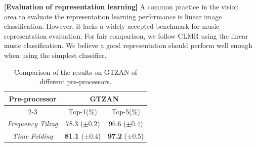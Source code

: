 \documentclass{article}
\begin{document}
\noindent\textbf{[Evaluation of representation learning]} A common practice in the vision area to evaluate the representation learning performance is linear image classification. However, it lacks a widely accepted benchmark for music representation evaluation. For fair comparison, we follow CLMR using the linear music classification. We believe a good representation should perform well enough when using the simplest classifier.

\begin{table}[t]
\centering
\setlength\tabcolsep{20pt}
\small 
\begin{tabular}{ c | c  c }
	\toprule
	\multirow{2}{*}[-0.7ex]{Pre-processor} & \multicolumn{2}{c}{GTZAN} \\
	\cmidrule(lr){2-3}
	& Top-1(\%) & Top-5(\%) \\
	\midrule
	\textit{Frequency Tiling} & 78.3 ($\pm{0.2}$) & 96.6 ($\pm{0.4}$) \\
    \textit{Time Folding} & \textbf{81.1} ($\pm{0.4}$) & \textbf{97.2} ($\pm{0.5}$) \\
	\bottomrule
\end{tabular}
\vspace{-0.2cm}
\caption{Comparison of the results on GTZAN of different pre-processors.}
\label{tab:pre_processor_new}
\vspace{-0.5cm}
\end{table}

% 
% 
\end{document}
